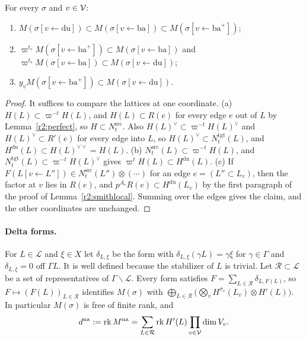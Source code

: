 \begin{lemma}\label{r2:slots}
For every $\sigma$ and $v\in\mathcal V$:
\begin{enumerate}
\item[(a)] $M(\sigma[v\leftarrow\mathrm{du}])\subset M(\sigma[v\leftarrow\mathrm{ba}])\subset M(\sigma[v\leftarrow\mathrm{ba}^+])$;
\item[(b)] $\varpi^{t_v}M(\sigma[v\leftarrow\mathrm{ba}^+])\subset M(\sigma[v\leftarrow\mathrm{ba}])$ and $\varpi^{t_v}M(\sigma[v\leftarrow\mathrm{ba}])\subset M(\sigma[v\leftarrow\mathrm{du}])$;
\item[(c)] $y_vM(\sigma[v\leftarrow\mathrm{ba}^+])\subset M(\sigma[v\leftarrow\mathrm{du}])$.
\end{enumerate}
\end{lemma}

\begin{proof}
It suffices to compare the lattices at one coordinate. (a) $H(L)\subset\varpi^{-t}H(L)$, and $H(L)\subset R(e)$ for every edge $e$ out of $L$ by Lemma~\ref{r2:perfect}, so $H\subset N^{\mathrm{src}}_t$. Also $H(L)^\vee\subset\varpi^{-t}H(L)^\vee$ and $H(L)^\vee\subset R'(e)$ for every edge into $L$, so $H(L)^\vee\subset N^{\mathrm{tgt}}_t(L)$, and $H^{\mathrm{du}}(L)\subset H(L)^{\vee\vee}=H(L)$. (b) $N^{\mathrm{src}}_t(L)\subset\varpi^{-t}H(L)$, and $N^{\mathrm{tgt}}_t(L)\subset\varpi^{-t}H(L)^\vee$ gives $\varpi^tH(L)\subset H^{\mathrm{du}}(L)$. (c) If $F(L[v\leftarrow L''])\in N^{\mathrm{src}}_t(L'')\otimes(\cdots)$ for an edge $e=(L''\subset L_v)$, then the factor at $v$ lies in $R(e)$, and $p^{A_r}R(e)\subset H^{\mathrm{du}}(L_v)$ by the first paragraph of the proof of Lemma~\ref{r2:smithlocal}. Summing over the edges gives the claim, and the other coordinates are unchanged.
\end{proof}

\paragraph{Delta forms.} For $L\in\mathcal L$ and $\xi\in X$ let $\delta_{L,\xi}$ be the form with $\delta_{L,\xi}(\gamma L)=\gamma\xi$ for $\gamma\in\Gamma$ and $\delta_{L,\xi}=0$ off $\Gamma L$. It is well defined because the stabilizer of $L$ is trivial. Let $\mathcal R\subset\mathcal L$ be a set of representatives of $\Gamma\backslash\mathcal L$. Every form satisfies $F=\sum_{L\in\mathcal R}\delta_{L,F(L)}$, so $F\mapsto(F(L))_{L\in\mathcal R}$ identifies $M(\sigma)$ with $\bigoplus_{L\in\mathcal R}\big(\bigotimes_vH^{\sigma_v}(L_v)\otimes H'(L)\big)$. In particular $M(\sigma)$ is free of finite rank, and
\[
d^{\mathrm{na}}:=\operatorname{rk} M^{\mathrm{na}}=\sum_{L\in\mathcal R}\operatorname{rk} H'(L)\prod_{v\in\mathcal V}\dim V_v .
\]


